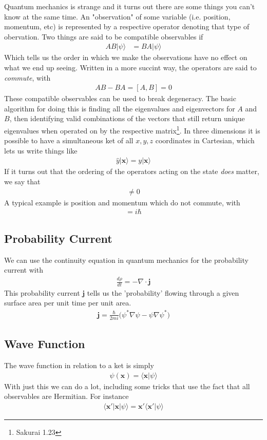 Quantum mechanics is strange and it turns out there are some things you can't know at the same time. An "observation" of some variable (i.e. position, momentum, etc) is represented by a respective operator denoting that type of obervation. Two things are said to be compatible observables if
\begin{align}
AB|\psi\rangle  &= BA |\psi\rangle
\end{align}
Which tells us the order in which we make the observations have no effect on what we end up seeing. Written in a more succint way, the operators are said to \emph{commute}, with
\begin{align}
AB - BA = [A,B] = 0
\end{align}
These compatible observables can be used to break degeneracy. The basic algorithm for doing this is finding all the eigenvalues and eigenvectors for $A$ and $B$, then identifying valid combinations of the vectors that still return unique eigenvalues when operated on by the respective matrix\footnote{Sakurai 1.23}. In three dimensions it is possible to have a simultaneous ket of all $x,y,z$ coordinates in Cartesian, which lets us write things like
\begin{align}
\hat{y}|\textbf{x}\rangle = y|\textbf{x}\rangle
\end{align}
If it turns out that the ordering of the operators acting on the state \emph{does} matter, we say that
\begin{align}
[A,B]\neq 0
\end{align}
A typical example is position and momentum which do not commute, with
\begin{align}
[x,p] = i\hbar
\end{align}

\subsection{Probability Current}
We can use the continuity equation in quantum mechanics for the probability current with
\begin{align}
\frac{d\rho}{dt} = -\nabla\cdot\textbf{j}
\end{align}
This probability current $\textbf{j}$ tells us the 'probability' flowing through a given surface area per unit time per unit area.
\begin{align}
\textbf{j} = \frac{\hbar}{2mi}\Big(\psi^*\nabla\psi - \psi\nabla\psi^*\Big)
\end{align}


\subsection{Wave Function}
The wave function in relation to a ket is simply
\begin{align}
\psi(\textbf{x}) = \langle \textbf{x}|\psi\rangle
\end{align}
With just this we can do a lot, including some tricks that use the fact that all observables are Hermitian. For instance
\begin{align}
\langle \textbf{x}'  | \textbf{x} | \psi\rangle = \textbf{x}'\langle \textbf{x}'|\psi\rangle
\end{align}



